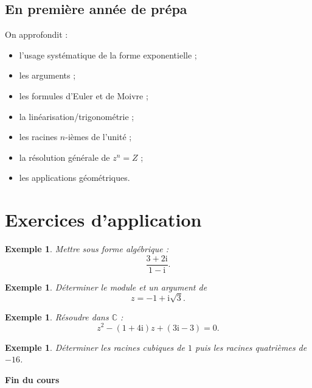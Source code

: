 \documentclass[11pt,a4paper]{article}
\newtheorem{exemple}[definition]{Exemple}
\newcommand{\C}{\mathbb{C}}
\newcommand{\ii}{\mathrm{i}}
\begin{document}
\subsection*{En première année de prépa}
On approfondit :
\begin{itemize}[leftmargin=1.2cm]
    \item l'usage systématique de la forme exponentielle ;
    \item les arguments ;
    \item les formules d'Euler et de Moivre ;
    \item la linéarisation/trigonométrie ;
    \item les racines $n$-ièmes de l'unité ;
    \item la résolution générale de $z^n=Z$ ;
    \item les applications géométriques.
\end{itemize}

\section{Exercices d'application}

\begin{exemple}
Mettre sous forme algébrique :
\[
\frac{3+2\ii}{1-\ii}.
\]
\end{exemple}

\begin{exemple}
Déterminer le module et un argument de
\[
z=-1+\ii\sqrt{3}.
\]
\end{exemple}

\begin{exemple}
Résoudre dans $\C$ :
\[
z^2-(1+4\ii)z+(3\ii-3)=0.
\]
\end{exemple}

\begin{exemple}
Déterminer les racines cubiques de $1$ puis les racines quatrièmes de $-16$.
\end{exemple}

\bigskip
\begin{center}
\textbf{Fin du cours}
\end{center}
\end{document}
